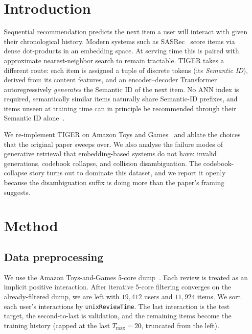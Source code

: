 \documentclass[sigconf]{acmart}
\begin{document}
\renewcommand{\shortauthors}{AhmadiTeshnizi, Ichli, and Raju}

\maketitle

\section{Introduction}
Sequential recommendation predicts the next item a user will interact with
given their chronological history.  Modern systems such as SASRec~\cite{kang2018sasrec}
score items via dense dot-products in an embedding space. At serving time
this is paired with approximate nearest-neighbor search to remain
tractable.  TIGER takes a different route: each item is assigned a tuple
of discrete tokens (its \emph{Semantic ID}), derived from its content
features, and an encoder--decoder Transformer autoregressively
\emph{generates} the Semantic ID of the next item.  No ANN index is
required, semantically similar items naturally share Semantic-ID prefixes,
and items unseen at training time can in principle be recommended through
their Semantic ID alone~\cite{rajput2023tiger}.

\begin{sloppypar}
We re-implement TIGER on Amazon Toys and
Games~\cite{mcauley2015image} and ablate the choices that the original
paper sweeps over.  We also analyse the failure modes of generative
retrieval that embedding-based systems do not have: invalid
generations, codebook collapse, and collision disambiguation.  The
codebook-collapse story turns out to dominate this dataset, and we
report it openly because the disambiguation suffix is doing more
than the paper's framing suggests.
\end{sloppypar}

\section{Method}
\subsection{Data preprocessing}
We use the Amazon Toys-and-Games 5-core
dump~\cite{mcauley2015image}.  Each review is treated as an implicit
positive interaction.  After iterative 5-core filtering converges on
the already-filtered dump, we are left with $19{,}412$ users and
$11{,}924$ items.  We sort each user's interactions by
\texttt{unixReviewTime}.  The last interaction is the test target,
the second-to-last is validation, and the remaining items become the
training history (capped at the last $T_{\text{max}}{=}20$, truncated
from the left).
\end{document}
